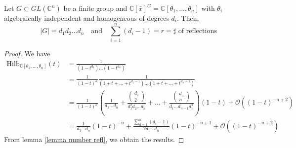 \documentclass[envcountsame,envcountchap]{svmono}
\begin{document}
\begin{corollary}
Let $G \subset GL(\mathbb{C}^n)$ be a finite group and $\mathbb{C}[\bar{x}]^G = \mathbb{C}[\theta_1, \ldots , \theta_n ]$ with $\theta_i$ algebraically independent and homogeneous of degrees $d_i$. Then,
\begin{equation}
|G| = d_1 d_2 \ldots d_n \quad \text{and} \quad \sum_{i=1}^n (d_i- 1) = r = \sharp\text{ of reflections}
\end{equation}
\label{corallary useful}
\end{corollary}
\begin{proof}
We have
\begin{equation}
\begin{split}
\text{Hilb}_{\mathbb{C}[\theta_1, \ldots, \theta_n]}(t) &= \frac{1}{(1-t^{d_1}) \ldots (1- t^{d_n})} \\
&= \frac{1}{(1-t)^n} \frac{1}{(1+ t + \ldots + t^{d_1 -1} ) \ldots (1+ t + \ldots + t^{d_n -1} )} \\
&= \frac{1}{(1-t)^n} \left( \frac{1}{d_1 \ldots d_n} + \frac{\begin{pmatrix}
d_1 \\
2          
\end{pmatrix}}{d_1^2 d_2 \ldots d_n} + \ldots + \frac{\begin{pmatrix}
d_n \\
n          
\end{pmatrix}}{d_1 \ldots d_{n-1} d_n^2} \right) (1-t) +\mathcal{O}( (1-t)^{-n+2} ) \\
&= \frac{1}{d_1 \ldots d_n} (1-t)^{-n} + \frac{\sum_{d=1}^n (d_i - 1)}{2 d_1 \ldots d_n} (1-t)^{-n+1} + \mathcal{O}((1-t)^{-n+2})
\end{split}
\end{equation} From lemma \ref{lemma number refl}, we obtain the results.
\end{proof}
 
\end{document}
